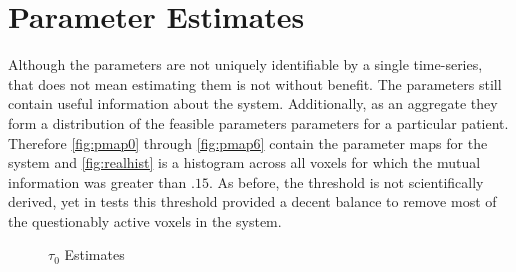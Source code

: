 \section{Parameter Estimates}
\label{sec:Real Data Parameter Estimates}
Although the parameters are not uniquely identifiable by a single time-series, that
does not mean estimating them is not without benefit. The parameters still contain useful
information about the system. Additionally, as an aggregate they form a distribution of
the feasible parameters parameters for a particular patient. Therefore 
\autoref{fig:pmap0} through \autoref{fig:pmap6}
contain the parameter maps for the system and \autoref{fig:realhist} is a histogram across all voxels
for which the mutual information was greater than $.15$. As before, the threshold is not
scientifically derived, yet in tests this threshold provided a decent balance to remove most
of the questionably active voxels in the system. 

\begin{figure}[H]
\centering
{}
\caption{$\tau_0$ Estimates}
\label{fig:pmap0}
\end{figure}

